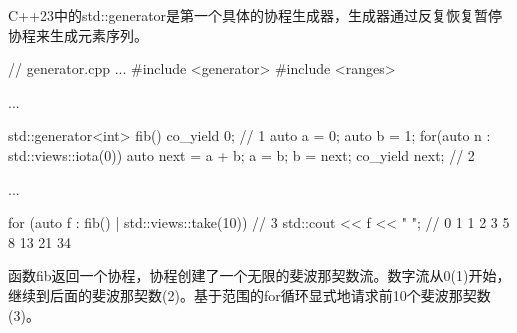 
C++23中的std::generator是第一个具体的协程生成器，生成器通过反复恢复暂停协程来生成元素序列。


\begin{cpp}
// generator.cpp
...
#include <generator>
#include <ranges>

...

std::generator<int> fib() {
	co_yield 0; // 1
	auto a = 0;
	auto b = 1;
	for(auto n : std::views::iota(0)) {
		auto next = a + b;
		a = b;
		b = next;
		co_yield next; // 2
	}
}

...

for (auto f : fib() | std::views::take(10)) { // 3
	std::cout << f << " "; // 0 1 1 2 3 5 8 13 21 34
}
\end{cpp}

函数fib返回一个协程，协程创建了一个无限的斐波那契数流。数字流从0(1)开始，继续到后面的斐波那契数(2)。基于范围的for循环显式地请求前10个斐波那契数(3)。





